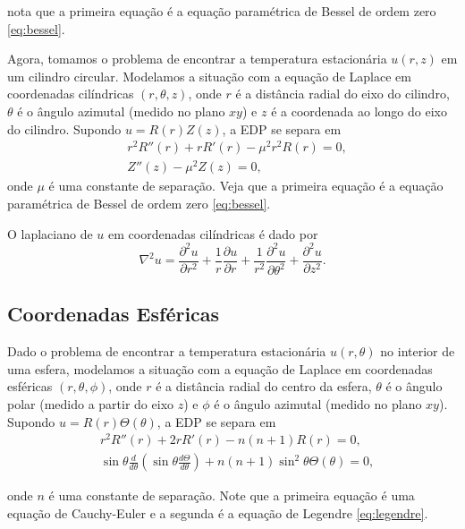 \documentclass{article}
\begin{document}
\noindent nota que a primeira equação é a equação paramétrica de Bessel de ordem zero \eqref{eq:bessel}.

Agora, tomamos o problema de encontrar a temperatura estacionária \(u(r,z)\) em um cilindro circular. Modelamos a situação com a equação de Laplace em coordenadas cilíndricas \((r, \theta, z)\), onde \(r\) é a distância radial do eixo do cilindro, \(\theta\) é o ângulo azimutal (medido no plano \(xy\)) e \(z\) é a coordenada ao longo do eixo do cilindro. Supondo \(u = R(r)Z(z)\), a EDP se separa em 
    \begin{align}
        &r^2 R''(r) + r R'(r) - \mu^2 r^2 R(r) = 0, \\
        &Z''(z) - \mu^2 Z(z) = 0,
    \end{align}
\noindent onde \(\mu\) é uma constante de separação. Veja que a primeira equação é a equação paramétrica de Bessel de ordem zero \eqref{eq:bessel}.

\begin{rem}
    O laplaciano de \(u\) em coordenadas cilíndricas é dado por
    \begin{equation}
        \nabla^2 u = \frac{\partial^2 u}{\partial r^2} + \frac{1}{r} \frac{\partial u}{\partial r} + \frac{1}{r^2} \frac{\partial^2 u}{\partial \theta^2} + \frac{\partial^2 u}{\partial z^2}.
    \end{equation}
\end{rem}

\subsection{Coordenadas Esféricas}

Dado o problema de encontrar a temperatura estacionária \(u(r, \theta)\) no interior de uma esfera, modelamos a situação com a equação de Laplace em coordenadas esféricas \((r, \theta, \phi)\), onde \(r\) é a distância radial do centro da esfera, \(\theta\) é o ângulo polar (medido a partir do eixo \(z\)) e \(\phi\) é o ângulo azimutal (medido no plano \(xy\)). Supondo \(u = R(r)\Theta(\theta)\), a EDP se separa em 
    \begin{align}
        &r^2 R''(r) + 2r R'(r) - n(n+1) R(r) = 0, \\
        &\sin\theta \frac{d}{d\theta}\left(\sin\theta \frac{d\Theta}{d\theta}\right) + n(n+1) \sin^2\theta \Theta(\theta) = 0,
    \end{align}

\noindent onde \(n\) é uma constante de separação. Note que a primeira equação é uma equação de Cauchy-Euler e a segunda é a equação de Legendre \eqref{eq:legendre}.
\end{document}
